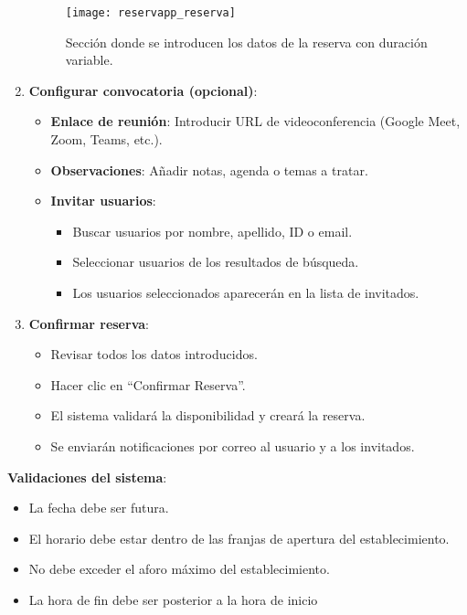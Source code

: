 \begin{enumerate}
   \begin{figure}[H]
	\centering
		\texttt{[image: reservapp\_reserva]}
	\caption{Sección donde se introducen los datos de la reserva con duración variable.}
	\label{fig:reservapp_reserva}
   \end{figure}

   \item \textbf{Configurar convocatoria (opcional)}:
   \begin{itemize}
      \item \textbf{Enlace de reunión}: Introducir URL de videoconferencia (Google Meet, Zoom, Teams, etc.).
      \item \textbf{Observaciones}: Añadir notas, agenda o temas a tratar.
      \item \textbf{Invitar usuarios}:
      \begin{itemize}
         \item Buscar usuarios por nombre, apellido, ID o email.
         \item Seleccionar usuarios de los resultados de búsqueda.
         \item Los usuarios seleccionados aparecerán en la lista de invitados.
      \end{itemize}
   \end{itemize}
   \item \textbf{Confirmar reserva}:
   \begin{itemize}
      \item Revisar todos los datos introducidos.
      \item Hacer clic en ``Confirmar Reserva''.
      \item El sistema validará la disponibilidad y creará la reserva.
      \item Se enviarán notificaciones por correo al usuario y a los invitados.
   \end{itemize}
\end{enumerate}

\textbf{Validaciones del sistema}:
\begin{itemize}
   \item La fecha debe ser futura.
   \item El horario debe estar dentro de las franjas de apertura del establecimiento.
   \item No debe exceder el aforo máximo del establecimiento.
   \item La hora de fin debe ser posterior a la hora de inicio
\end{itemize}

